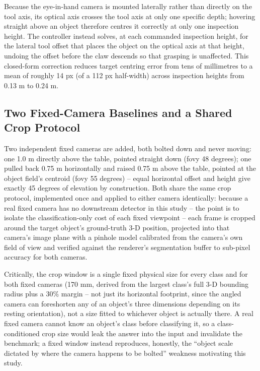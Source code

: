 \documentclass[conference]{IEEEtran}
\begin{document}
Because the eye-in-hand camera is mounted laterally rather than directly on the tool axis, its optical axis crosses the tool axis at only one specific depth; hovering straight above an object therefore centres it correctly at only one inspection height. The controller instead solves, at each commanded inspection height, for the lateral tool offset that places the object on the optical axis at that height, undoing the offset before the claw descends so that grasping is unaffected. This closed-form correction reduces target centring error from tens of millimetres to a mean of roughly 14 px (of a 112 px half-width) across inspection heights from 0.13 m to 0.24 m.

\subsection{Two Fixed-Camera Baselines and a Shared Crop Protocol}

Two independent fixed cameras are added, both bolted down and never moving: one 1.0 m directly above the table, pointed straight down (fovy 48 degrees); one pulled back 0.75 m horizontally and raised 0.75 m above the table, pointed at the object field's centroid (fovy 55 degrees) -- equal horizontal offset and height give exactly 45 degrees of elevation by construction. Both share the same crop protocol, implemented once and applied to either camera identically: because a real fixed camera has no downstream detector in this study -- the point is to isolate the classification-only cost of each fixed viewpoint -- each frame is cropped around the target object's ground-truth 3-D position, projected into that camera's image plane with a pinhole model calibrated from the camera's own field of view and verified against the renderer's segmentation buffer to sub-pixel accuracy for both cameras.

Critically, the crop window is a single fixed physical size for every class and for both fixed cameras (170 mm, derived from the largest class's full 3-D bounding radius plus a 30\% margin -- not just its horizontal footprint, since the angled camera can foreshorten any of an object's three dimensions depending on its resting orientation), not a size fitted to whichever object is actually there. A real fixed camera cannot know an object's class before classifying it, so a class-conditioned crop size would leak the answer into the input and invalidate the benchmark; a fixed window instead reproduces, honestly, the ``object scale dictated by where the camera happens to be bolted'' weakness motivating this study.
\end{document}
